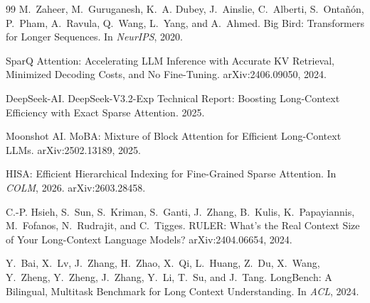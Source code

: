 \documentclass[11pt]{article}
\begin{document}
\begin{thebibliography}{99}
M.~Zaheer, M.~Guruganesh, K.~A. Dubey, J.~Ainslie, C.~Alberti, S.~Onta\~{n}\'{o}n, P.~Pham, A.~Ravula, Q.~Wang, L.~Yang, and A.~Ahmed. Big Bird: Transformers for Longer Sequences. In \emph{NeurIPS}, 2020.

SparQ Attention: Accelerating LLM Inference with Accurate KV Retrieval, Minimized Decoding Costs, and No Fine-Tuning. arXiv:2406.09050, 2024.

DeepSeek-AI. DeepSeek-V3.2-Exp Technical Report: Boosting Long-Context Efficiency with Exact Sparse Attention. 2025.

Moonshot AI. MoBA: Mixture of Block Attention for Efficient Long-Context LLMs. arXiv:2502.13189, 2025.

HISA: Efficient Hierarchical Indexing for Fine-Grained Sparse Attention. In \emph{COLM}, 2026. arXiv:2603.28458.

C.-P. Hsieh, S.~Sun, S.~Kriman, S.~Ganti, J.~Zhang, B.~Kulis, K.~Papayiannis, M.~Fofanos, N.~Rudrajit, and C.~Tigges. RULER: What's the Real Context Size of Your Long-Context Language Models? arXiv:2404.06654, 2024.

Y.~Bai, X.~Lv, J.~Zhang, H.~Zhao, X.~Qi, L.~Huang, Z.~Du, X.~Wang, Y.~Zheng, Y.~Zheng, J.~Zhang, Y.~Li, T.~Su, and J.~Tang. LongBench: A Bilingual, Multitask Benchmark for Long Context Understanding. In \emph{ACL}, 2024.
\end{thebibliography}
\end{document}
